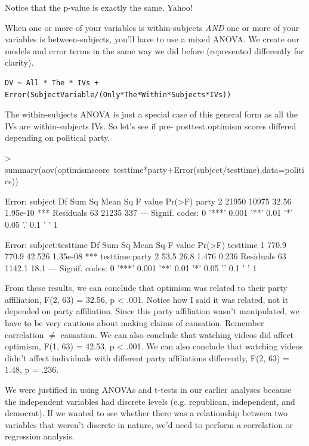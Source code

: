\documentclass[12pt]{article}
\newcounter{subsubsubsection}[subsubsection]
\begin{document}
Notice that the p-value is exactly the same. Yahoo!

When one or more of your variables is within-subjects \emph{AND} one or more of your variables
is between-subjects, you'll have to use a mixed ANOVA. We create our models and error terms
in the same way we did before (represented differently for clarity).

\begin{verbatim}
DV ~ All * The * IVs + Error(SubjectVariable/(Only*The*Within*Subjects*IVs))
\end{verbatim}

The within-subjects ANOVA is just a special case of this general form as all the IVs are
within-subjects IVs. So let's see if pre- posttest optimism scores differed depending on
political party.

\begin{Schunk}
\begin{Sinput}
> summary(aov(optimismscore~testtime*party+Error(subject/testtime),data=politics))
\end{Sinput}
\begin{Soutput}
Error: subject
          Df Sum Sq Mean Sq F value   Pr(>F)    
party      2  21950   10975   32.56 1.95e-10 ***
Residuals 63  21235     337                     
---
Signif. codes:  
0 '***' 0.001 '**' 0.01 '*' 0.05 '.' 0.1 ' ' 1

Error: subject:testtime
               Df Sum Sq Mean Sq F value   Pr(>F)    
testtime        1  770.9   770.9  42.526 1.35e-08 ***
testtime:party  2   53.5    26.8   1.476    0.236    
Residuals      63 1142.1    18.1                     
---
Signif. codes:  
0 '***' 0.001 '**' 0.01 '*' 0.05 '.' 0.1 ' ' 1
\end{Soutput}
\end{Schunk}

From these results, we can conclude that optimism was related to their party affiliation, 
F(2, 63) = 32.56, p < .001. Notice how I said it was related, not it depended on party
affiliation. Since this party affiliation wasn't manipulated, we have to be very cautious
about making claims of causation. Remember correlation $\neq$ causation. We can
also conclude that watching videos did affect optimism, F(1, 63) = 42.53, p < .001. We can
also conclude that watching videos didn't affect individuals with different party affiliations
differently, F(2, 63) = 1.48, p = .236.

We were justified in using ANOVAs and t-tests in our earlier analyses because the independent
variables had discrete levels (e.g. republican, independent, and democrat). If we wanted
to see whether there was a relationship between two variables that weren't discrete in nature,
we'd need to perform a correlation or regression analysis.
\end{document}
